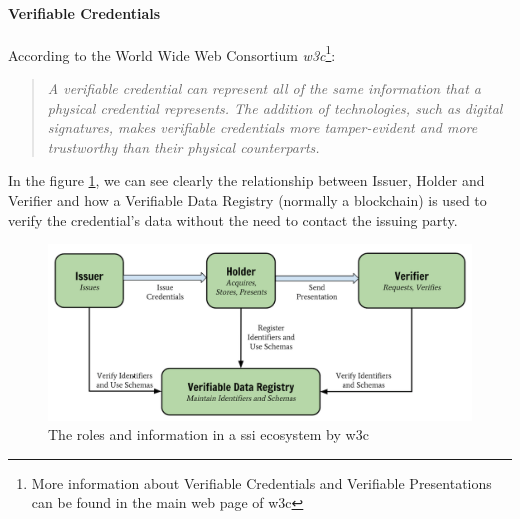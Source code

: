 \paragraph{Verifiable Credentials}
According to the World Wide Web Consortium \textit{\acrshort{w3c}}\cite{w3c-vc}\footnote{\label{footnote-w3c}More information about Verifiable Credentials and Verifiable Presentations can be found in the main web page of \acrshort{w3c}\cite{w3c-vc}}:
\begin{quote}
    \textit{A verifiable credential can represent all of the same information that a physical credential represents. The addition of technologies, such as digital signatures, makes verifiable credentials more tamper-evident and more trustworthy than their physical counterparts.}
\end{quote}
In the figure \ref{fig:ssi-vc}, we can see clearly the relationship between Issuer, Holder and Verifier and how a Verifiable Data Registry (normally a blockchain) is used to verify the credential's data without the need to contact the issuing party.
\begin{figure}[h]
    \centering
    \includegraphics[width=1.0\textwidth]{images/State of the Art/ssi/ssi-vc.png}
    \caption{The roles and information in a \acrshort{ssi} ecosystem by \acrshort{w3c}}
    \label{fig:ssi-vc}
\end{figure}

